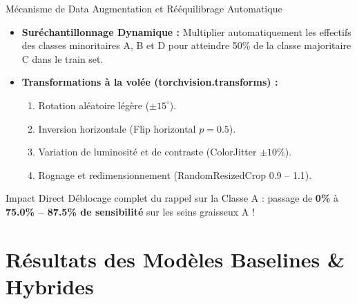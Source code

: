 \documentclass[10pt, compress]{beamer}
\begin{document}
\begin{frame}{Mécanisme de Data Augmentation et Rééquilibrage Automatique}
    \begin{itemize}
        \item \textbf{Suréchantillonnage Dynamique :} Multiplier automatiquement les effectifs des classes minoritaires A, B et D pour atteindre 50\% de la classe majoritaire C dans le train set.
        \item \textbf{Transformations à la volée (torchvision.transforms) :}
            \begin{enumerate}
                \item Rotation aléatoire légère ($\pm 15^\circ$).
                \item Inversion horizontale (Flip horizontal $p=0.5$).
                \item Variation de luminosité et de contraste (ColorJitter $\pm 10\%$).
                \item Rognage et redimensionnement (RandomResizedCrop 0.9 -- 1.1).
            \end{enumerate}
    \end{itemize}
    \begin{exampleblock}{Impact Direct}
        Déblocage complet du rappel sur la Classe A : passage de \textbf{0\%} à \textbf{75.0\% -- 87.5\% de sensibilité} sur les seins graisseux A !
    \end{exampleblock}
\end{frame}

\section{Résultats des Modèles Baselines \& Hybrides}
\end{document}
